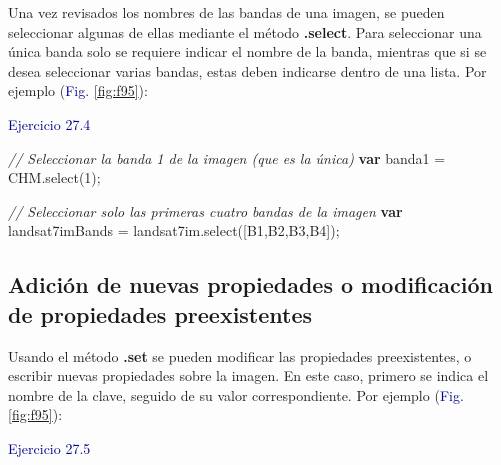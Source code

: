 \documentclass[
  12pt,
  letterpaper,
  twoside]{book}
\newenvironment{Shaded}{\begin{snugshade}}{\end{snugshade}}
\newcommand{\CommentTok}[1]{\textcolor[rgb]{0.24,0.58,0.00}{\textit{#1}}}
\newcommand{\ControlFlowTok}[1]{\textcolor[rgb]{0.00,0.00,0.00}{\textbf{#1}}}
\newcommand{\FunctionTok}[1]{\textcolor[rgb]{0.48,0.12,0.64}{#1}}
\newcommand{\NormalTok}[1]{#1}
\newcommand{\OperatorTok}[1]{\textcolor[rgb]{0.00,0.00,0.00}{#1}}
\newcommand{\StringTok}[1]{\textcolor[rgb]{0.87,0.29,0.22}{#1}}
\newcommand\boldpurple[1]{\textcolor{darkpurple}{\textbf{#1}}}
\begin{document}
Una vez revisados los nombres de las bandas de una imagen, se pueden seleccionar algunas de ellas mediante el método \boldpurple{.select}. Para seleccionar una única banda solo se requiere indicar el nombre de la banda, mientras que si se desea seleccionar varias bandas, estas deben indicarse dentro de una lista. Por ejemplo (\textcolor{darkblue}{Fig.} \ref{fig:f95}):

\textcolor{darkblue}{Ejercicio 27.4}

\begin{Shaded}
\begin{Highlighting}[]
\CommentTok{// Seleccionar la banda 1 de la imagen (que es la única)}
\ControlFlowTok{var}\NormalTok{ banda1 }\OperatorTok{=}\NormalTok{ CHM}\OperatorTok{.}\FunctionTok{select}\NormalTok{(}\StringTok{\textquotesingle{}1\textquotesingle{}}\NormalTok{)}\OperatorTok{;}

\CommentTok{// Seleccionar solo las primeras cuatro bandas de la imagen}
\ControlFlowTok{var}\NormalTok{ landsat7imBands }\OperatorTok{=}\NormalTok{ landsat7im}\OperatorTok{.}\FunctionTok{select}\NormalTok{([}\StringTok{\textquotesingle{}B1\textquotesingle{}}\OperatorTok{,}\StringTok{\textquotesingle{}B2\textquotesingle{}}\OperatorTok{,}\StringTok{\textquotesingle{}B3\textquotesingle{}}\OperatorTok{,}\StringTok{\textquotesingle{}B4\textquotesingle{}}\NormalTok{])}\OperatorTok{;}
\end{Highlighting}
\end{Shaded}

\hypertarget{adiciuxf3n-de-nuevas-propiedades-o-modificaciuxf3n-de-propiedades-preexistentes-1}{%
\subsection*{Adición de nuevas propiedades o modificación de propiedades preexistentes}\label{adiciuxf3n-de-nuevas-propiedades-o-modificaciuxf3n-de-propiedades-preexistentes-1}}

Usando el método \boldpurple{.set} se pueden modificar las propiedades preexistentes, o escribir nuevas propiedades sobre la imagen. En este caso, primero se indica el nombre de la clave, seguido de su valor correspondiente. Por ejemplo (\textcolor{darkblue}{Fig.} \ref{fig:f95}):

\textcolor{darkblue}{Ejercicio 27.5}
\end{document}
